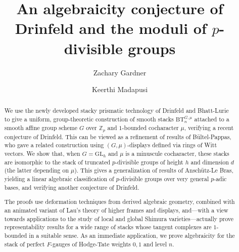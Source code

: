 \documentclass[10pt]{amsart}
\begin{document}
\title[Conjectures of Drinfeld]{An algebraicity conjecture of Drinfeld and the moduli of $p$-divisible groups}
\author{Zachary Gardner}
\address{Zachary Gardner\\
Department of Mathematics\\
Maloney Hall\\
Boston College\\
Chestnut Hill, MA 02467\\
USA}
\author{Keerthi Madapusi}
\address{Keerthi Madapusi\\
Department of Mathematics\\
Maloney Hall\\
Boston College\\
Chestnut Hill, MA 02467\\
USA}

\begin{abstract}
We use the newly developed stacky prismatic technology of Drinfeld and Bhatt-Lurie to give a uniform, group-theoretic construction of smooth stacks $\mathrm{BT}^{G,\mu}_{n}$ attached to a smooth affine group scheme $G$ over $\mathbb{Z}_p$ and $1$-bounded cocharacter $\mu$, verifying a recent conjecture of Drinfeld. This can be viewed as a refinement of results of B\"ultel-Pappas, who gave a related construction using $(G,\mu)$-displays defined via rings of Witt vectors. We show that, when $G = \mathrm{GL}_h$ and $\mu$ is a minuscule cocharacter, these stacks are isomorphic to the stack of truncated $p$-divisible groups of height $h$ and dimension $d$ (the latter depending on $\mu$). This gives a generalization of results of Ansch\"utz-Le Bras, yielding a linear algebraic classification of $p$-divisible groups over very general $p$-adic bases, and verifying another conjecture of Drinfeld.

The proofs use deformation techniques from derived algebraic geometry, combined with an animated variant of Lau's theory of higher frames and displays, and---with a view towards applications to the study of local and global Shimura varieties---actually prove representability results for a wide range of stacks whose tangent complexes are $1$-bounded in a suitable sense. As an immediate application, we prove algebraicity for the stack of perfect $F$-gauges of Hodge-Tate weights $0,1$ and level $n$.
\end{abstract}

\maketitle
\end{document}
